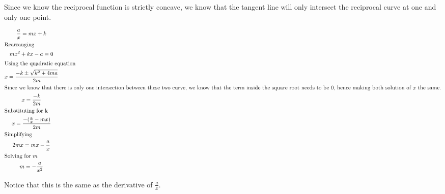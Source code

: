 \documentclass[a4paper]{article}
\begin{document}
Since we know the reciprocal function is strictly concave, we know that the tangent line will only intersect the reciprocal curve at one and only one point.


\begin{gather*}
\frac{a}{x} = mx+k\\
\shortintertext{Rearranging}
mx^2 + kx - a = 0\\
\shortintertext{Using the quadratic equation}
x = \frac{-k \pm \sqrt{k^2 + 4ma}}{2m}\\
\shortintertext{Since we know that there is only one intersection between these two curve, we know that the term inside the square root needs to be $0$, hence making both solution of $x$ the same.}
x = \frac{-k}{2m}\\
\shortintertext{Substituting for k}
x = \frac{-(\frac{a}{x}-mx)}{2m}\\
\shortintertext{Simplifying}
2mx = mx -\frac{a}{x}\\
\shortintertext{Solving for $m$}
m = -\frac{a}{x^2}\\
\end{gather*}

Notice that this is the same as the derivative of $\frac{a}{x}$.
\end{document}
